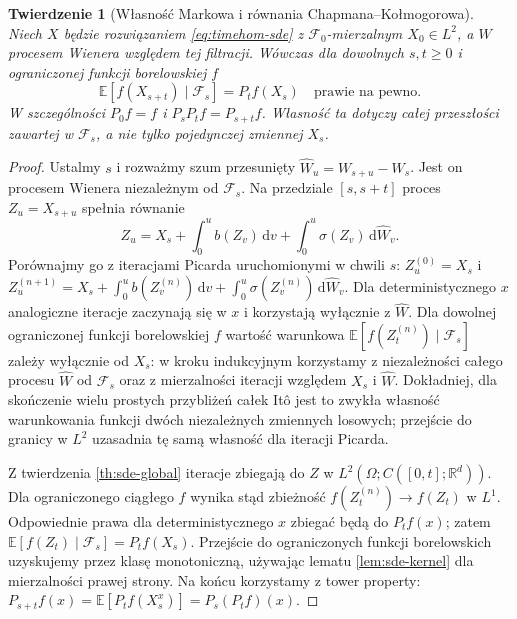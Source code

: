 \documentclass[11pt,a4paper,oneside]{report}
\numberwithin{equation}{chapter}
\theoremstyle{plain}
\newtheorem{twierdzenie}{Twierdzenie}[chapter]
\theoremstyle{definition}
\theoremstyle{remark}
\newcommand{\R}{\mathbb{R}}
\newcommand{\E}{\mathbb{E}}
\newcommand{\calF}{\mathcal{F}}
\newcommand{\dd}{\mathrm{d}}
\begin{document}
\begin{twierdzenie}[Własność Markowa i równania Chapmana--Kołmogorowa]\label{thm:volIII:06:01}
\label{th:sde-markov}
Niech $X$ będzie rozwiązaniem \eqref{eq:timehom-sde}
z $\calF_0$-mierzalnym $X_0\in L^2$, a $W$ procesem
Wienera względem tej filtracji. Wówczas dla dowolnych
$s,t\ge0$ i ograniczonej funkcji borelowskiej $f$
\[
\E[f(X_{s+t})\mid\calF_s]=P_tf(X_s)
\quad\text{prawie na pewno}.
\tag{6.3}\label{eq:sde-markov}
\]
W szczególności $P_0f=f$ i $P_sP_tf=P_{s+t}f$.
Własność ta dotyczy \emph{całej przeszłości} zawartej
w $\calF_s$, a nie tylko pojedynczej zmiennej $X_s$.
\end{twierdzenie}
\begin{proof}
Ustalmy $s$ i rozważmy szum przesunięty
$\widehat W_u=W_{s+u}-W_s$. Jest on procesem Wienera
niezależnym od $\calF_s$. Na przedziale $[s,s+t]$
proces $Z_u=X_{s+u}$ spełnia równanie
\[
Z_u=X_s+\int_0^u b(Z_v)\,\dd v
+\int_0^u\sigma(Z_v)\,\dd\widehat W_v.
\]
Porównajmy go z iteracjami Picarda uruchomionymi
w chwili $s$: $Z^{(0)}_u=X_s$ i
$Z^{(n+1)}_u=X_s+\int_0^u b(Z_v^{(n)})\,\dd v
+\int_0^u\sigma(Z_v^{(n)})\,\dd\widehat W_v$.
Dla deterministycznego $x$ analogiczne iteracje
zaczynają się w $x$ i korzystają wyłącznie z
$\widehat W$. Dla dowolnej ograniczonej funkcji
borelowskiej $f$ wartość warunkowa
$\E[f(Z_t^{(n)})\mid\calF_s]$ zależy wyłącznie od
$X_s$: w kroku indukcyjnym korzystamy z niezależności
całego procesu $\widehat W$ od $\calF_s$ oraz z
mierzalności iteracji względem $X_s$ i $\widehat W$.
Dokładniej, dla skończenie wielu prostych przybliżeń
całek Itô jest to zwykła własność warunkowania
funkcji dwóch niezależnych zmiennych losowych;
przejście do granicy w $L^2$ uzasadnia tę samą
własność dla iteracji Picarda.

Z twierdzenia \ref{th:sde-global} iteracje zbiegają do
$Z$ w $L^2(\Omega;C([0,t];\R^d))$.
Dla ograniczonego ciągłego $f$ wynika stąd
zbieżność $f(Z_t^{(n)})\to f(Z_t)$ w $L^1$.
Odpowiednie prawa dla deterministycznego $x$
zbiegać będą do $P_tf(x)$; zatem
$\E[f(Z_t)\mid\calF_s]=P_tf(X_s)$.
Przejście do ograniczonych funkcji borelowskich
uzyskujemy przez klasę monotoniczną, używając
lematu \ref{lem:sde-kernel} dla mierzalności
prawej strony. Na końcu korzystamy z tower property:
$P_{s+t}f(x)=\E[P_tf(X_s^x)]=P_s(P_tf)(x)$.
\end{proof}
\end{document}
